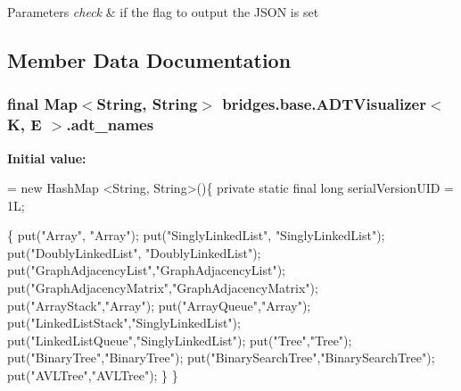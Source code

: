 \begin{DoxyParams}{Parameters}
{\em check} & if the flag to output the J\+S\+O\+N is set \\
\hline
\end{DoxyParams}


\subsection{Member Data Documentation}
\hypertarget{classbridges_1_1base_1_1_a_d_t_visualizer_a6646d020143637569d607fa109c71ff9}{}
\subsubsection[{adt\+\_\+names}]{\setlength{\rightskip}{0pt plus 5cm}final Map$<$String, String$>$ {\bf bridges.\+base.\+A\+D\+T\+Visualizer}$<$ K, E $>$.adt\+\_\+names}\label{classbridges_1_1base_1_1_a_d_t_visualizer_a6646d020143637569d607fa109c71ff9}
{\bfseries Initial value\+:}
\begin{DoxyCode}
=
            \textcolor{keyword}{new} HashMap <String, String>()\{
                \textcolor{keyword}{private} \textcolor{keyword}{static} \textcolor{keyword}{final} \textcolor{keywordtype}{long} serialVersionUID = 1L;

                \{
                    put(\textcolor{stringliteral}{"Array"}, \textcolor{stringliteral}{"Array"});
                    put(\textcolor{stringliteral}{"SinglyLinkedList"}, \textcolor{stringliteral}{"SinglyLinkedList"});
                    put(\textcolor{stringliteral}{"DoublyLinkedList"}, \textcolor{stringliteral}{"DoublyLinkedList"});
                    put(\textcolor{stringliteral}{"GraphAdjacencyList"},\textcolor{stringliteral}{"GraphAdjacencyList"});
                    put(\textcolor{stringliteral}{"GraphAdjacencyMatrix"},\textcolor{stringliteral}{"GraphAdjacencyMatrix"});
                    put(\textcolor{stringliteral}{"ArrayStack"},\textcolor{stringliteral}{"Array"});
                    put(\textcolor{stringliteral}{"ArrayQueue"},\textcolor{stringliteral}{"Array"});
                    put(\textcolor{stringliteral}{"LinkedListStack"},\textcolor{stringliteral}{"SinglyLinkedList"});
                    put(\textcolor{stringliteral}{"LinkedListQueue"},\textcolor{stringliteral}{"SinglyLinkedList"});
                    put(\textcolor{stringliteral}{"Tree"},\textcolor{stringliteral}{"Tree"});
                    put(\textcolor{stringliteral}{"BinaryTree"},\textcolor{stringliteral}{"BinaryTree"});
                    put(\textcolor{stringliteral}{"BinarySearchTree"},\textcolor{stringliteral}{"BinarySearchTree"});
                    put(\textcolor{stringliteral}{"AVLTree"},\textcolor{stringliteral}{"AVLTree"});
                \}
            \}
\end{DoxyCode}
